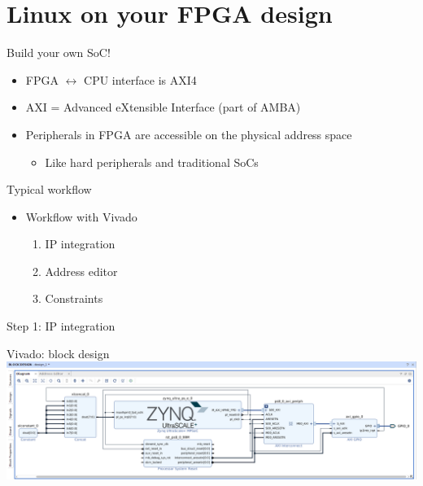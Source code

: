 \documentclass[xetex,table]{beamer}
\begin{document}
\section{Linux on your FPGA design}

\begin{frame}{Build your own SoC!}
  \begin{itemize}
  \item FPGA $\leftrightarrow$ CPU interface is AXI4
  \item AXI = Advanced eXtensible Interface (part of AMBA)
  \item Peripherals in FPGA are accessible on the physical address
    space
    \begin{itemize}
    \item Like hard peripherals and traditional SoCs
    \end{itemize}
  \end{itemize}
\end{frame}

\begin{frame}{Typical workflow}
  \begin{itemize}
  \item Workflow with Vivado
    \begin{enumerate}
    \item IP integration
    \item Address editor
    \item Constraints
    \end{enumerate}
  \end{itemize}
\end{frame}

\begin{frame}[standout]
  Step 1: IP integration
\end{frame}

\begin{frame}{Vivado: block design}
  \center\includegraphics[width=1.0\textwidth]{images/block-design.png}
\end{frame}
\end{document}

